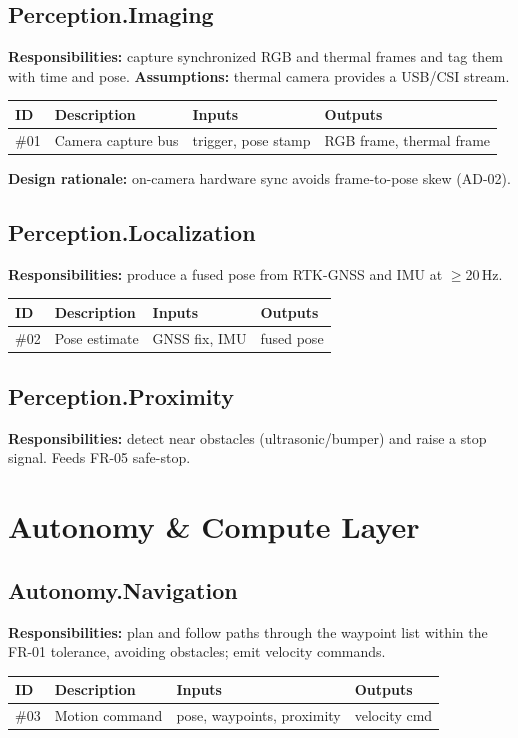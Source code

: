 \documentclass[11pt,letterpaper]{article}
\begin{document}
\subsection{Perception.Imaging}
\textbf{Responsibilities:} capture synchronized RGB and thermal frames and tag them
with time and pose. \textbf{Assumptions:} thermal camera provides a USB/CSI stream.
\begin{table}[H]\begin{center}\begin{tabular}{ | p{1cm} | p{6cm} | p{2.6cm} | p{2.6cm} |}\hline
ID & Description & Inputs & Outputs \\ \hline
\#01 & Camera capture bus & trigger, pose stamp & RGB frame, thermal frame \\ \hline
\end{tabular}\end{center}\end{table}
\textbf{Design rationale:} on-camera hardware sync avoids frame-to-pose skew (AD-02).
\subsection{Perception.Localization}
\textbf{Responsibilities:} produce a fused pose from RTK-GNSS and IMU at $\geq$20\,Hz.
\begin{table}[H]\begin{center}\begin{tabular}{ | p{1cm} | p{6cm} | p{2.6cm} | p{2.6cm} |}\hline
ID & Description & Inputs & Outputs \\ \hline
\#02 & Pose estimate & GNSS fix, IMU & fused pose \\ \hline
\end{tabular}\end{center}\end{table}
\subsection{Perception.Proximity}
\textbf{Responsibilities:} detect near obstacles (ultrasonic/bumper) and raise a
stop signal. Feeds FR-05 safe-stop.

\section{Autonomy \& Compute Layer}
\subsection{Autonomy.Navigation}
\textbf{Responsibilities:} plan and follow paths through the waypoint list within
the FR-01 tolerance, avoiding obstacles; emit velocity commands.
\begin{table}[H]\begin{center}\begin{tabular}{ | p{1cm} | p{6cm} | p{2.6cm} | p{2.6cm} |}\hline
ID & Description & Inputs & Outputs \\ \hline
\#03 & Motion command & pose, waypoints, proximity & velocity cmd \\ \hline
\end{tabular}\end{center}\end{table}
\end{document}
